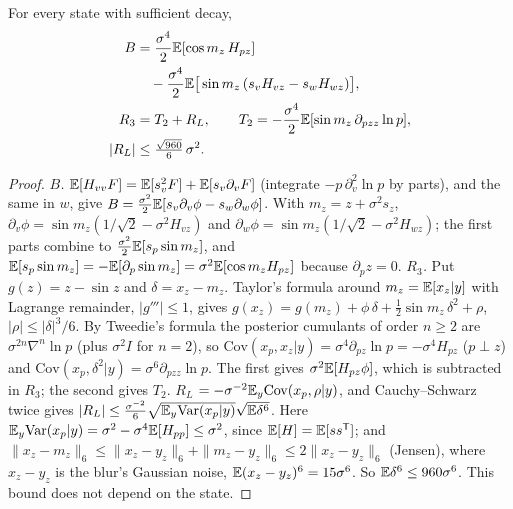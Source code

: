 \begin{lemma} \proofst
\label{lem:G2}
For every state with sufficient decay,
\begin{equation*}
\begin{aligned}
B&=\frac{\sigma^4}{2}\mathbb{E}[\cos m_z\,H_{pz}]\\&\quad-\frac{\sigma^4}{2}\mathbb{E}\big[\sin m_z\,(s_vH_{vz}-s_wH_{wz})\big],\\
R_3&=T_2+R_L,\qquad T_2=-\frac{\sigma^4}{2}\mathbb{E}[\sin m_z\,\partial_{pzz}\ln p],\\
|R_L|&\le\tfrac{\sqrt{960}}6\,\sigma^2 .
\end{aligned}
\end{equation*}
\end{lemma}
\begin{proof}
\emph{$B$.} $\mathbb{E}[H_{vv}F]=\mathbb{E}[s_v^2F]+\mathbb{E}[s_v\partial_vF]$ (integrate $-p\,\partial_v^2\ln p$ by parts), and the same in $w$, give
$B=\frac{\sigma^2}2\mathbb{E}[s_v\partial_v\phi-s_w\partial_w\phi]$. With $m_z=z+\sigma^2s_z$, $\partial_v\phi=\sin m_z(1/\sqrt2-\sigma^2H_{vz})$ and
$\partial_w\phi=\sin m_z(1/\sqrt2-\sigma^2H_{wz})$; the first parts combine to $\frac{\sigma^2}2\mathbb{E}[s_p\sin m_z]$, and $\mathbb{E}[s_p\sin m_z]=-\mathbb{E}[\partial_p\sin m_z]=\sigma^2\mathbb{E}[\cos m_zH_{pz}]$
because $\partial_pz=0$.
\emph{$R_3$.} Put $g(z)=z-\sin z$ and $\delta=x_z-m_z$. Taylor's formula around $m_z=\mathbb{E}[x_z|y]$ with Lagrange remainder, $|g'''|\le1$, gives
$g(x_z)=g(m_z)+\phi\,\delta+\frac12\sin m_z\,\delta^2+\rho$, $|\rho|\le|\delta|^3/6$. By Tweedie's formula the posterior cumulants of order $n\ge2$ are
$\sigma^{2n}\nabla^n\ln p$ (plus $\sigma^2I$ for $n=2$), so $\mathrm{Cov}(x_p,x_z|y)=\sigma^4\partial_{pz}\ln p=-\sigma^4H_{pz}$ ($p\perp z$) and
$\mathrm{Cov}(x_p,\delta^2|y)=\sigma^6\partial_{pzz}\ln p$. The first gives $\sigma^2\mathbb{E}[H_{pz}\phi]$, which is subtracted in $R_3$; the second gives $T_2$.
\emph{$R_L$} $=-\sigma^{-2}\mathbb{E}_y\mathrm{Cov}(x_p,\rho|y)$, and Cauchy--Schwarz twice gives
$|R_L|\le\frac{\sigma^{-2}}6\sqrt{\mathbb{E}_y\mathrm{Var}(x_p|y)}\sqrt{\mathbb{E}\delta^6}$. Here $\mathbb{E}_y\mathrm{Var}(x_p|y)=\sigma^2-\sigma^4\mathbb{E}[H_{pp}]\le\sigma^2$, since
$\mathbb{E}[H]=\mathbb{E}[ss^{\mathsf T}]$; and $\|x_z-m_z\|_6\le\|x_z-y_z\|_6+\|m_z-y_z\|_6\le2\|x_z-y_z\|_6$ (Jensen), where $x_z-y_z$ is the blur's Gaussian noise,
$\mathbb{E}(x_z-y_z)^6=15\sigma^6$. So $\mathbb{E}\delta^6\le960\sigma^6$. This bound does not depend on the state.
\end{proof}

